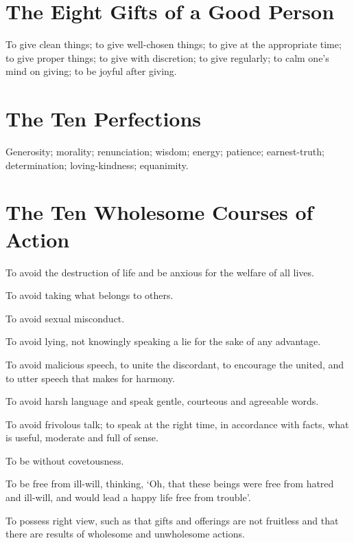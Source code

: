 \section*{The Eight Gifts of a Good Person}

To give clean things; to give well-chosen things; to give at the appropriate
time; to give proper things; to give with discretion; to give regularly; to calm
one's mind on giving; to be joyful after giving.\\
\mbox{}

\vspace*{-\baselineskip}

\section*{The Ten Perfections}

Generosity; morality; renunciation; wisdom; energy; patience; earnest-truth;
determination; loving-kindness; equanimity.\\
\mbox{}

\vspace*{-\baselineskip}

\section*{The Ten Wholesome Courses of Action}

To avoid the destruction of life and be anxious for the welfare of all lives.

To avoid taking what belongs to others.

To avoid sexual misconduct.

To avoid lying, not knowingly speaking a lie for the sake of any advantage.

To avoid malicious speech, to unite the discordant, to encourage the united, and
to utter speech that makes for harmony.

To avoid harsh language and speak gentle, courteous and agreeable words.

To avoid frivolous talk; to speak at the right time, in accordance with facts,
what is useful, moderate and full of sense.

To be without covetousness.

To be free from ill-will, thinking, ‘Oh, that these beings were free from hatred
and ill-will, and would lead a happy life free from trouble’.

To possess right view, such as that gifts and offerings are not fruitless and
that there are results of wholesome and unwholesome actions.\\
\mbox{}

